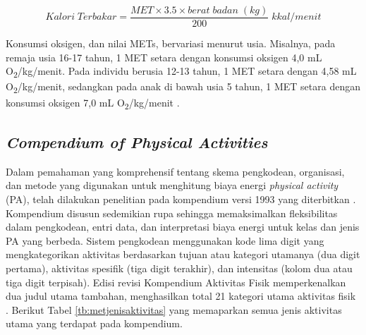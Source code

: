 \begin{equation}
  \label{eq:RumusKalori1}
  Kalori \; Terbakar = \frac{MET \times 3.5 \times berat \; badan \; (kg)}{200} \; kkal/menit
\end{equation}

Konsumsi oksigen, dan nilai METs, bervariasi menurut usia. Misalnya, pada remaja usia 16-17 tahun, 1 MET setara dengan konsumsi oksigen 4,0 mL O\textsubscript{2}/kg/menit. Pada individu berusia 12-13 tahun, 1 MET setara dengan 4,58 mL O\textsubscript{2}/kg/menit, sedangkan pada anak di bawah usia 5 tahun, 1 MET setara dengan konsumsi oksigen 7,0 mL O\textsubscript{2}/kg/menit \parencite{Pinheiro}.

\subsection{\emph{Compendium of Physical Activities}}
\label{subsec:compendium}

Dalam pemahaman yang komprehensif tentang skema pengkodean, organisasi, dan metode yang digunakan untuk menghitung biaya energi \emph{physical activity} (PA), telah dilakukan penelitian pada kompendium versi 1993 yang diterbitkan \parencite{Ainsworth}. Kompendium disusun sedemikian rupa sehingga memaksimalkan fleksibilitas dalam pengkodean, entri data, dan interpretasi biaya energi untuk kelas dan jenis PA yang berbeda. Sistem pengkodean menggunakan kode lima digit yang mengkategorikan aktivitas berdasarkan tujuan atau kategori utamanya (dua digit pertama), aktivitas spesifik (tiga digit terakhir), dan intensitas (kolom dua atau tiga digit terpisah). Edisi revisi Kompendium Aktivitas Fisik memperkenalkan dua judul utama tambahan, menghasilkan total 21 kategori utama aktivitas fisik \parencite{Haskell}. Berikut Tabel \ref{tb:metjenisaktivitas} yang memaparkan semua jenis aktivitas utama yang terdapat pada kompendium.


